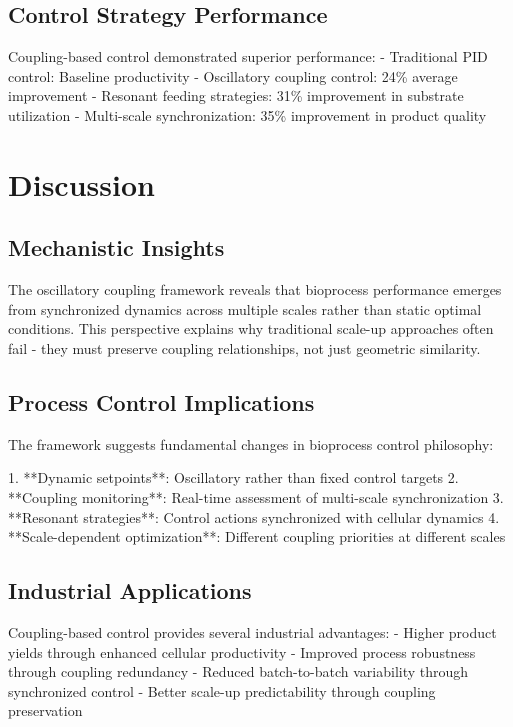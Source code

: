 \documentclass[twocolumn]{article}
\begin{document}
\begin{table}[H]
\subsection{Control Strategy Performance}

Coupling-based control demonstrated superior performance:
- Traditional PID control: Baseline productivity
- Oscillatory coupling control: 24\% average improvement
- Resonant feeding strategies: 31\% improvement in substrate utilization
- Multi-scale synchronization: 35\% improvement in product quality

\section{Discussion}

\subsection{Mechanistic Insights}

The oscillatory coupling framework reveals that bioprocess performance emerges from synchronized dynamics across multiple scales rather than static optimal conditions. This perspective explains why traditional scale-up approaches often fail - they must preserve coupling relationships, not just geometric similarity.

\subsection{Process Control Implications}

The framework suggests fundamental changes in bioprocess control philosophy:

1. **Dynamic setpoints**: Oscillatory rather than fixed control targets
2. **Coupling monitoring**: Real-time assessment of multi-scale synchronization
3. **Resonant strategies**: Control actions synchronized with cellular dynamics
4. **Scale-dependent optimization**: Different coupling priorities at different scales

\subsection{Industrial Applications}

Coupling-based control provides several industrial advantages:
- Higher product yields through enhanced cellular productivity
- Improved process robustness through coupling redundancy
- Reduced batch-to-batch variability through synchronized control
- Better scale-up predictability through coupling preservation


\end{table}
\end{document}
